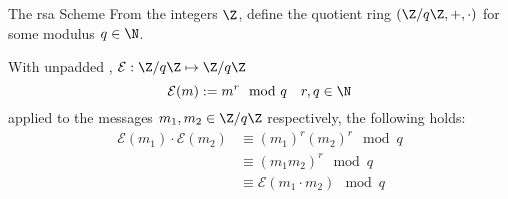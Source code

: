 \begin{frame}{The \gls{rsa} Scheme}
  From the integers $\Z$, define the quotient ring $(\Z/q\Z, +, \cdot)$ for some modulus $q \in \N$.

  With unpadded  \parencite{1983-rsa}, $\mathcal{E}: \Z/q\Z \mapsto \Z/q\Z$
  $$\mathcal{E}(m) := m^r \mod q \quad r, q \in \N$$
  applied to the messages $m_1, m_2 \in \Z/q\Z$ respectively, the following holds:
  \begin{align*}
    \mathcal{E}(m_1) \cdot \mathcal{E}(m_2)
     & \equiv (m_1)^r (m_2)^r \mod q            \\
     & \equiv (m_1 m_2)^r \mod q                \\
     & \equiv \mathcal{E}(m_1 \cdot m_2) \mod q
  \end{align*}
\end{frame}
